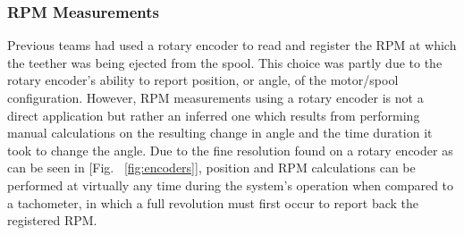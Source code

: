 
\subsubsection{RPM Measurements}

\begin{table}[H]
\caption{\label{tab:RPM_WRE}Weighted Ratings Evaluation of RPM Measurement Device.}
\centering
{}
\end{table}

\indent\indent Previous teams had used a rotary encoder to read and register the RPM at which the teether was being ejected from the spool. This choice was partly due to the rotary encoder's ability to report position, or angle, of the motor/spool configuration. However, RPM measurements using a rotary encoder is not a direct application but rather an inferred one which results from performing manual calculations on the resulting change in angle and the time duration it took to change the angle. Due to the fine resolution found on a rotary encoder as can be seen in [Fig. ~\ref{fig:encoders}], position and RPM calculations can be performed at virtually any time during the system's operation when compared to a tachometer, in which a full revolution must first occur to report back the registered RPM.

